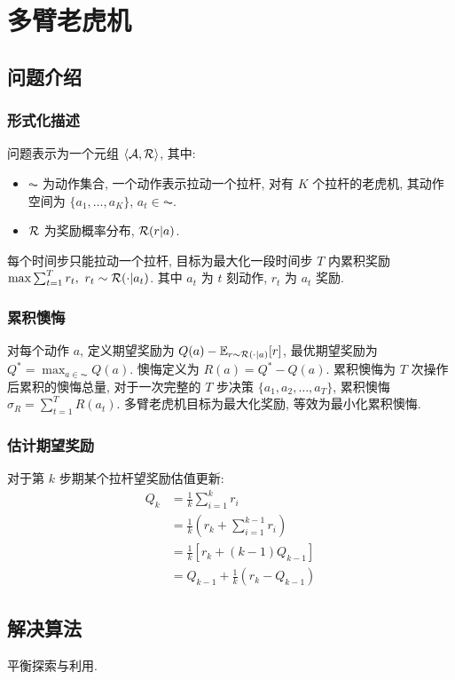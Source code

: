 \newpage
\section{多臂老虎机}

\subsection{问题介绍}
\subsubsection{形式化描述}
问题表示为一个元组 $\braket{\mathcal{A},\mathcal{R}}$, 其中:
\begin{itemize}
    \item $\AC$ 为动作集合, 一个动作表示拉动一个拉杆, 对有 $K$ 个拉杆的老虎机, 其动作空间为 $\{ a_1,\dots,a_K \}$, $a_t\in \AC$.
    \item $\mathcal{R}$ 为奖励概率分布, $\mathcal{R}(r|a)$. 
\end{itemize}

每个时间步只能拉动一个拉杆, 目标为最大化一段时间步 $T$ 内累积奖励 $\max \sum_{t=1}^T r_t,\ r_t\sim \mathcal{R}(\cdot | a_t)$. 其中 $a_t$ 为 $t$ 刻动作, $r_t$ 为 $a_t$ 奖励. 

\subsubsection{累积懊悔}

对每个动作 $a$, 定义期望奖励为 $Q(a)-\mathbb{E}_{r\sim \mathcal{R}(\cdot | a) }[r]$, 最优期望奖励为 $Q^*=\max_{a\in\AC}Q(a)$. 懊悔定义为 $R(a)=Q^*-Q(a)$. 累积懊悔为 $T$ 次操作后累积的懊悔总量, 对于一次完整的 $T$ 步决策 $\{ a_1, a_2,\dots,a_T \}$, 累积懊悔 $\sigma_R=\sum_{t=1}^TR(a_t)$. 多臂老虎机目标为最大化奖励, 等效为最小化累积懊悔. 

\subsubsection{估计期望奖励}
对于第 $k$ 步期某个拉杆望奖励估值更新:
\begin{align*}
    Q_k&=\frac{1}{k}\sum_{i=1}^k r_i\\
    &=\frac{1}{k}\left( r_k+\sum_{i=1}^{k-1}r_i \right) \\
    &=\frac{1}{k}\left[ r_k+(k-1)Q_{k-1}\right] \\
    &=Q_{k-1}+\frac{1}{k}(r_k-Q_{k-1})
\end{align*}

\subsection{解决算法}
平衡探索与利用.

